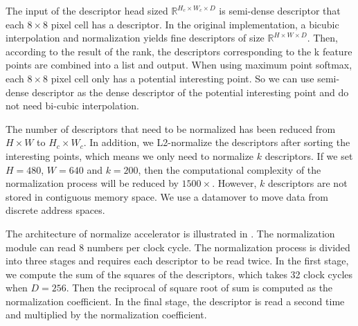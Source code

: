 The input of the descriptor head sized $\mathbb{R}^{H_c\times W_c\times D}$ is semi-dense descriptor that each $8\times8$ pixel cell has a descriptor. In the original implementation, a bicubic interpolation and normalization yields fine descriptors of size $\mathbb{R}^{H\times W\times D}$. Then, according to the result of the rank, the descriptors corresponding to the k feature points are combined into a list and output. When using maximum point softmax, each $8\times8$ pixel cell only has a potential interesting point. So we can use semi-dense descriptor as the dense descriptor of the potential interesting point and do not need bi-cubic interpolation.

The number of descriptors that need to be normalized has been reduced from $H\times W$ to $H_c\times W_c$. In addition, we L2-normalize the descriptors after sorting the interesting points, which means we only need to normalize $k$ descriptors. If we set $H=480$, $W=640$ and $k=200$, then the computational complexity of the normalization process will be reduced by $1500\times$. However, $k$ descriptors are not stored in contiguous memory space. We use a datamover to move data from discrete address spaces.

The architecture of normalize accelerator is illustrated in . The normalization module can read 8 numbers per clock cycle. The normalization process is divided into three stages and requires each descriptor to be read twice. In the first stage, we compute the sum of the squares of the descriptors, which takes 32 clock cycles when $D=256$. Then the reciprocal of square root of sum is computed as the normalization coefficient. In the final stage, the descriptor is read a second time and multiplied by the normalization coefficient.